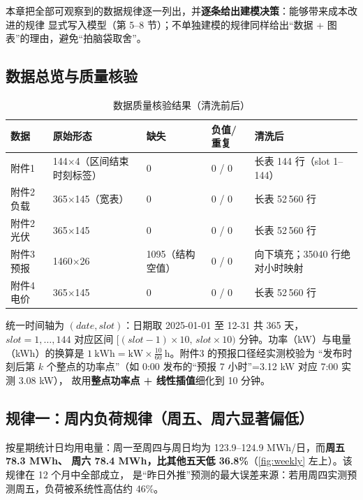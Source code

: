 \documentclass[12pt,a4paper,fontset=fandol]{ctexart}
\begin{document}
本章把全部可观察到的数据规律逐一列出\nobreak，并\textbf{逐条给出建模决策}\nobreak：能够带来成本改进的规律
显式写入模型（第 5--8 节\nobreak）\nobreak；不单独建模的规律同样给出“数据 + 图表\nobreak”的理由\nobreak，避免“拍脑袋取舍\nobreak”\nobreak。

\subsection{数据总览与质量核验}

\begin{table}[htbp]
\centering
\caption{数据质量核验结果（清洗前后\nobreak）}
\label{tab:quality}
\begin{tabular}{@{}lllll@{}}
\toprule
数据 & 原始形态 & 缺失 & 负值/重复 & 清洗后 \\
\midrule
附件1 & 144$\times$4（区间结束时刻标签\nobreak） & 0 & 0 / 0 & 长表 144 行（slot 1--144\nobreak） \\
附件2 负载 & 365$\times$145（宽表\nobreak） & 0 & 0 / 0 & 长表 52\,560 行 \\
附件2 光伏 & 365$\times$145 & 0 & 0 / 0 & 长表 52\,560 行 \\
附件3 预报 & 1460$\times$26 & 1095（结构空值\nobreak） & 0 / 0 & 向下填充\nobreak；35040 行绝对小时映射 \\
附件4 电价 & 365$\times$145 & 0 & 0 / 0 & 长表 52\,560 行 \\
\bottomrule
\end{tabular}
\end{table}

统一时间轴为 $(date,slot)$\nobreak：日期取 2025-01-01 至 12-31 共 365 天\nobreak，$slot=1,\dots,144$
对应区间 $[(slot-1)\times10,\,slot\times10)$ 分钟\nobreak。功率（kW\nobreak）与电量（kWh\nobreak）的换算是
$1\ \text{kWh}=\text{kW}\times\frac{10}{60}\ \text{h}$\nobreak。附件3 的预报口径经实测校验为
“发布时刻后第 $k$ 个整点的功率点\nobreak”（如 0:00 发布的“预报 7 小时\nobreak”=3.12 kW 对应 7:00 实测 3.08 kW\nobreak）\nobreak，
故用\textbf{整点功率点 + 线性插值}细化到 10 分钟\nobreak。

\subsection{规律一\nobreak：周内负荷规律（周五\nobreak、周六显著偏低\nobreak）}

按星期统计日均用电量\nobreak：周一至周四与周日均为 123.9--124.9 MWh/日\nobreak，而\textbf{周五 78.3 MWh\nobreak、
周六 78.4 MWh\nobreak，比其他五天低 36.8\%}（\cref{fig:weekly} 左上\nobreak）\nobreak。该规律在 12 个月中全部成立\nobreak，
是“昨日外推\nobreak”预测的最大误差来源\nobreak：若用周四实测预测周五\nobreak，负荷被系统性高估约 46\%\nobreak。
\end{document}
